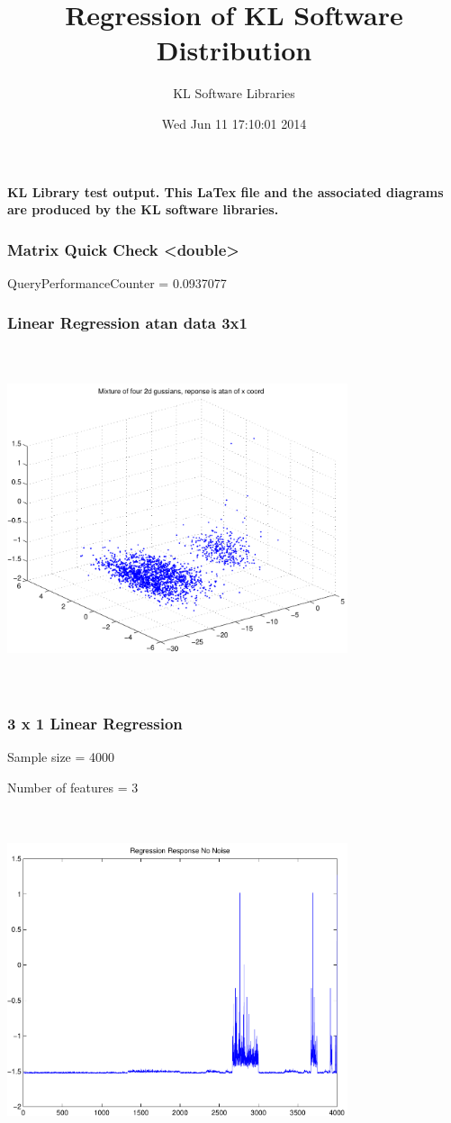 \documentclass[9pt]{article}
\theoremstyle{plain}
\theoremstyle{definition}
\theoremstyle{remark}
\numberwithin{equation}{section}
\begin{document}
\title{Regression of KL Software Distribution   }
\author{KL Software Libraries}
\date{Wed Jun 11 17:10:01 2014
}
\maketitle
\textbf{ KL Library test output.  This LaTex file and the associated diagrams are produced by the KL software libraries.}
\subsubsection{Matrix Quick Check <double>}
QueryPerformanceCounter  =  0.0937077
\subsubsection{Linear Regression atan data 3x1}
\includegraphics[width=10.0cm,height=10.0cm]{AtanDataSet.pdf}

\subsubsection{3 x 1 Linear Regression}
Sample size = 4000

Number of features = 3

\includegraphics[width=10.0cm,height=10.0cm]{AtanDataSet_regression_response_no_noise.pdf}
\end{document}
